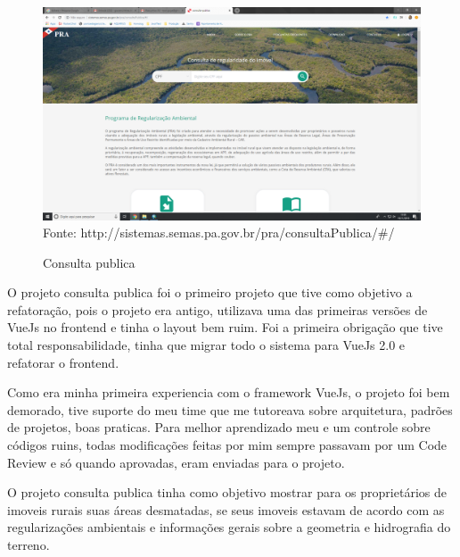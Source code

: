 \begin{figure}[H]
\centering
\caption{Consulta publica} %
\includegraphics[scale=0.22]{consulta-publica}\\  %
{\small Fonte: http://sistemas.semas.pa.gov.br/pra/consultaPublica/#/} %
\label{fig:exemplo} %
\end{figure}

O projeto consulta publica foi o primeiro projeto que tive como objetivo a refatoração, pois o projeto era antigo, utilizava uma das primeiras versões de VueJs no frontend e tinha o layout bem ruim.
Foi a primeira obrigação que tive total responsabilidade, tinha que migrar todo o sistema para VueJs 2.0 e refatorar o frontend.

Como era minha primeira experiencia com o framework VueJs, o projeto foi bem demorado, tive suporte do meu time que me tutoreava sobre arquitetura, padrões de projetos, boas praticas.
Para melhor aprendizado meu e um controle sobre códigos ruins, todas modificações feitas por mim sempre passavam por um Code Review e só quando aprovadas, eram enviadas para o projeto. 

O projeto consulta publica tinha como objetivo mostrar para os proprietários de imoveis rurais suas áreas desmatadas, se seus imoveis estavam de acordo com as regularizações ambientais e informações gerais sobre a geometria e hidrografia do terreno.


